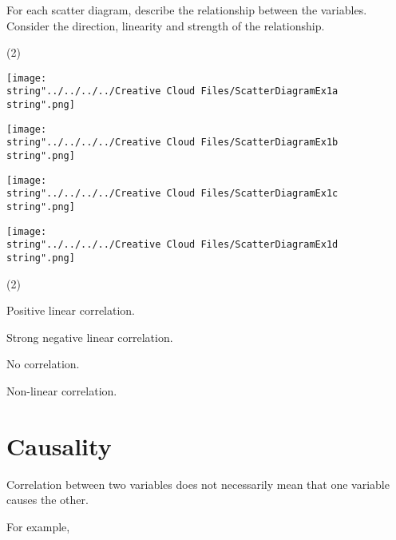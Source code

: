 \documentclass[11pt,a4paper]{book}
\begin{document}
\begin{example}

For each scatter diagram, describe the relationship between the variables.
Consider the direction, linearity and strength of the relationship.

\begin{tasks}[label=(\alph*),label-width=3.5ex](2)

\task \texttt{[image: \\string"../../../../Creative Cloud Files/ScatterDiagramEx1a\\string".png]}

\task \texttt{[image: \\string"../../../../Creative Cloud Files/ScatterDiagramEx1b\\string".png]}

\task \texttt{[image: \\string"../../../../Creative Cloud Files/ScatterDiagramEx1c\\string".png]}

\task \texttt{[image: \\string"../../../../Creative Cloud Files/ScatterDiagramEx1d\\string".png]}

\end{tasks}

\Solution

\begin{tasks}[label=(\alph*),label-width=3.5ex](2)

\task  Positive linear correlation.

\task  Strong negative linear correlation.

\task  No correlation.

\task  Non-linear correlation.

\end{tasks}
\end{example}

\newpage

\section{Causality}

Correlation between two variables does not necessarily mean that one
variable causes the other.

For example,
\end{document}
